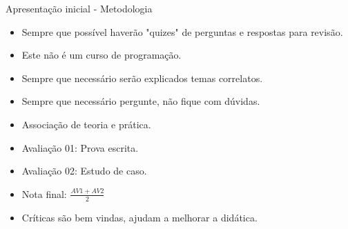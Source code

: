 
\begin{frame}{Apresentação inicial - Metodologia}
    \begin{itemize}
        \item Sempre que possível haverão "quizes" de perguntas e respostas para revisão.
        \item Este não é um curso de programação.
        \item Sempre que necessário serão explicados temas correlatos.
        \item Sempre que necessário pergunte, não fique com dúvidas.
        \item Associação de teoria e prática.
        \item Avaliação 01: Prova escrita.
        \item Avaliação 02: Estudo de caso.
        \item Nota final: $\frac{AV1 + AV2}{2}$
        \item Críticas são bem vindas, ajudam a melhorar a didática.
    \end{itemize}
\end{frame}
